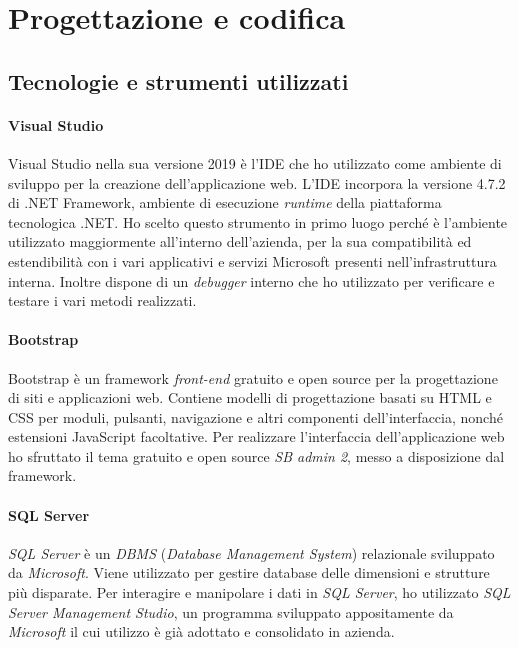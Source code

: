 

\section{Progettazione e codifica}

\subsection{Tecnologie e strumenti utilizzati}

\paragraph{Visual Studio}
Visual Studio nella sua versione 2019 è l'IDE che ho utilizzato come ambiente di sviluppo per la creazione dell'applicazione web. L'IDE incorpora la versione 4.7.2 di .NET Framework, ambiente di esecuzione \textit{runtime} della piattaforma tecnologica .NET.
Ho scelto questo strumento in primo luogo perché è l'ambiente utilizzato maggiormente all'interno dell'azienda, per la sua compatibilità ed estendibilità con i vari applicativi e servizi Microsoft presenti nell'infrastruttura interna. Inoltre dispone di un \textit{debugger} interno che ho utilizzato per verificare e testare i vari metodi realizzati.

\paragraph{Bootstrap}
Bootstrap è un framework \textit{front-end} gratuito e open source per la progettazione di
siti e applicazioni web. Contiene modelli di progettazione basati su HTML e
CSS per moduli, pulsanti, navigazione e altri componenti dell'interfaccia, nonché
estensioni JavaScript facoltative. Per realizzare l'interfaccia dell'applicazione web ho sfruttato il tema gratuito e open source \textit{SB admin 2}, messo a disposizione dal framework.

\paragraph{SQL Server}
\textit{SQL Server} è un \textit{DBMS} (\textit{Database Management System}) relazionale sviluppato da \textit{Microsoft}. Viene utilizzato per gestire database delle dimensioni e strutture più disparate.
Per interagire e manipolare i dati in \textit{SQL Server}, ho utilizzato \textit{SQL Server Management Studio}, un programma sviluppato appositamente da \textit{Microsoft} il cui utilizzo è già adottato e consolidato in azienda.

